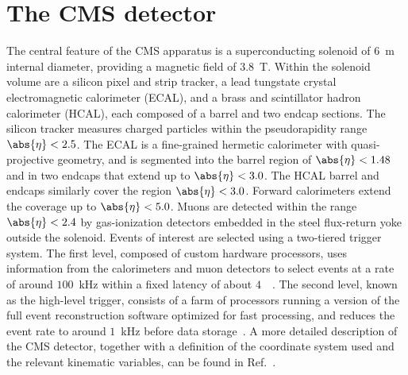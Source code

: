 \section{The CMS detector}
\label{sec:detector}

The central feature of the CMS apparatus is a superconducting solenoid of $6$~\unit{m} internal diameter, 
providing a magnetic field of $3.8$~\unit{T}. 
Within the solenoid volume are a silicon pixel and strip tracker, 
a lead tungstate crystal electromagnetic calorimeter (ECAL), 
and a brass and scintillator hadron calorimeter (HCAL), 
each composed of a barrel and two endcap sections.
The silicon tracker measures charged particles within the pseudorapidity range $\abs{\eta} < 2.5$. 
The ECAL is a fine-grained hermetic calorimeter with quasi-projective geometry,
and is segmented into the barrel region of $\abs{\eta} < 1.48$ and in two endcaps that extend up to $\abs{\eta} < 3.0$.
The HCAL barrel and endcaps similarly cover the region $\abs{\eta} < 3.0$.
Forward calorimeters extend the coverage up to $\abs{\eta} < 5.0$.
Muons are detected within the range $\abs{\eta} < 2.4$ 
by gas-ionization detectors embedded in the steel flux-return yoke outside the solenoid. 
Events of interest are selected using a two-tiered trigger system. 
The first level, composed of custom hardware processors, uses information from the calorimeters and muon detectors 
to select events at a rate of around $100$~\unit{kHz} within a fixed latency of about $4$~\mus~\cite{Sirunyan:2020zal}. 
The second level, known as the high-level trigger, 
consists of a farm of processors running a version of the full event reconstruction software optimized for fast processing, 
and reduces the event rate to around $1$~\unit{kHz} before data storage~\cite{Khachatryan:2016bia}. 
A more detailed description of the CMS detector, 
together with a definition of the coordinate system used and the relevant kinematic variables, can be found in Ref.~\cite{Chatrchyan:2008zzk}. 
